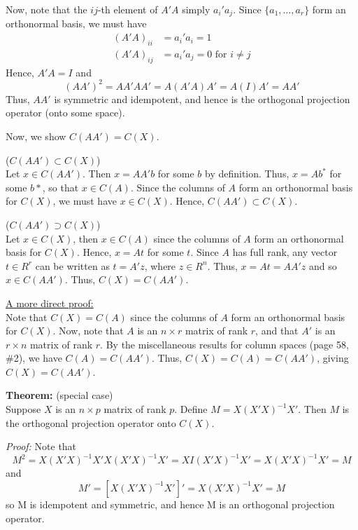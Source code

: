 \documentclass[12pt]{article}
\numberwithin{equation}{section}
\begin{document}
Now, note that the $ij$-th element of $A'A$ simply $a_i' a_j$. Since $\{a_1, \ldots, a_r\}$ form an orthonormal basis, we must have
%
\begin{align*}
  (A'A)_{ii} &= a_i' a_i = 1 \\
  (A'A)_{ij} &= a_i' a_j = 0 \text{ for } i \ne j
\end{align*}
%
Hence, $A'A = I$ and
\begin{equation*}
  (AA')^2 = AA' AA' = A(A'A)A' = A(I)A' = AA'
\end{equation*}
Thus, $AA'$ is symmetric and idempotent, and hence is the orthogonal projection operator (onto some space).

Now, we show $C(AA') = C(X)$.

($C(AA') \subset C(X)$) \\
Let $x \in C(AA')$. Then $x = AA'b$ for some $b$ by definition. Thus, $x = Ab^*$ for some $b*$, so that $x \in C(A)$. Since the columns of $A$ form an orthonormal basis for $C(X)$, we must have $x \in C(X)$. Hence, $C(AA') \subset C(X)$.

($C(AA') \supset C(X)$) \\
Let $x \in C(X)$, then $x \in C(A)$ since the columns of $A$ form an orthonormal basis for $C(X)$. Hence, $x = At$ for some $t$. Since $A$ has full rank, any vector $t \in R^r$ can be written as $t = A'z$, where $z \in R^n$. Thus, $x = At = AA'z$ and so $x \in C(AA')$. Thus, $C(X) = C(AA')$.

\underline{A more direct proof:} \\
Note that $C(X) = C(A)$ since the columns of $A$ form an orthonormal basis for $C(X)$. Now, note that $A$ is an $n \times r$ matrix of rank $r$, and that $A'$ is an $r \times n$ matrix of rank $r$. By the miscellaneous results for column spaces (page 58, \#2), we have 
$C(A) = C(AA')$. Thus, $C(X) = C(A) = C(AA')$, giving $C(X) = C(AA')$.

\textbf{Theorem:} (special case) \\
Suppose $X$ is an $n \times p$ matrix of rank $p$. Define $M = X(X'X)^{-1} X'$. Then $M$ is the orthogonal projection operator onto $C(X)$.

\textit{Proof:}
Note that
\begin{equation*}
  M^2 = X(X'X)^{-1} X' X (X'X)^{-1} X' = X I (X'X)^{-1} X'
    = X (X'X)^{-1} X' = M
\end{equation*}
and 
\begin{equation*}
  M' = [X (X'X)^{-1} X']' = X(X'X)^{-1} X' = M
\end{equation*}
so M is idempotent and symmetric, and hence M is an orthogonal projection operator.
\end{document}
